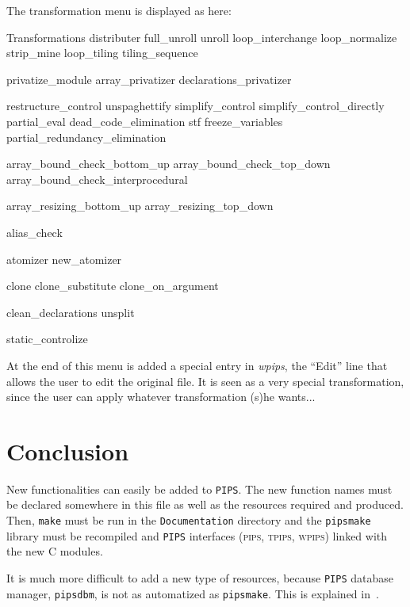 \documentclass[a4paper]{report}
\newcommand{\Pips}{\texttt{PIPS}}
\newcommand{\Pipsmake}{\texttt{pipsmake}}
\newcommand{\WPIPS}{{\em wpips}}
\begin{document}
The transformation menu is displayed as here:
\begin{PipsMenu}{Transformations}
  distributer
  full_unroll
  unroll
  loop_interchange
  loop_normalize
  strip_mine
  loop_tiling
  tiling_sequence

  privatize_module
  array_privatizer
  declarations_privatizer

  restructure_control
  unspaghettify
  simplify_control
  simplify_control_directly
  partial_eval
  dead_code_elimination
  stf
  freeze_variables
  partial_redundancy_elimination

  array_bound_check_bottom_up
  array_bound_check_top_down
  array_bound_check_interprocedural

  array_resizing_bottom_up
  array_resizing_top_down

  alias_check

  atomizer
  new_atomizer

  clone
  clone_substitute
  clone_on_argument

  clean_declarations
  unsplit

  static_controlize
\end{PipsMenu}


At the end of this menu is added a special entry in \WPIPS, the ``Edit'' line
that allows the user to edit the original file. It is seen as a very
special transformation, since the user can apply whatever
transformation (s)he wants...







\chapter{Conclusion}

New functionalities can easily be added to \Pips{}. The new function names
must be declared somewhere in this file as well as the resources required
and produced. Then, {\tt make} must be run in the {\tt Documentation}
directory and the \Pipsmake{} library must be recompiled and \Pips{}
interfaces (\textsc{pips}, \textsc{tpips}, \textsc{wpips}) linked with the
new C modules.

It is much more difficult to add a new type of resources, because \Pips{}
database manager, \texttt{pipsdbm}, is not as automatized as
\Pipsmake{}. This is explained in~\cite{Iri94}.
\end{document}
